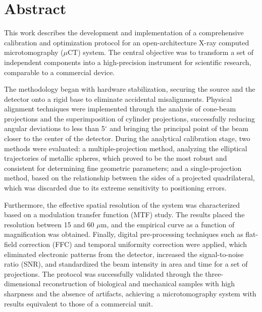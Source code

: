 \chapter*{Abstract}

This work describes the development and implementation of a comprehensive calibration
and optimization protocol for an open-architecture X-ray computed microtomography
($\mu$CT) system. The central objective was to transform a set of independent components
into a high-precision instrument for scientific research, comparable to a commercial
device.

The methodology began with hardware stabilization, securing the source and the detector
onto a rigid base to eliminate accidental misalignments. Physical alignment techniques
were implemented through the analysis of cone-beam projections and the superimposition
of cylinder projections, successfully reducing angular deviations to less than 5$^{\circ}$
and bringing the principal point of the beam closer to the center of the detector.
During the analytical calibration stage, two methods were evaluated: a multiple-projection
method, analyzing the elliptical trajectories of metallic spheres, which proved to
be the most robust and consistent for determining fine geometric parameters; and a
single-projection method, based on the relationship between the sides of a projected
quadrilateral, which was discarded due to its extreme sensitivity to positioning
errors.

Furthermore, the effective spatial resolution of the system was characterized based
on a modulation transfer function (MTF) study. The results placed the resolution
between 15 and 60 $\mu$m, and the empirical curve as a function of magnification
was obtained. Finally, digital pre-processing techniques such as flat-field correction
(FFC) and temporal uniformity correction were applied, which eliminated electronic
patterns from the detector, increased the signal-to-noise ratio (SNR), and standardized
the beam intensity in area and time for a set of projections. The protocol was
successfully validated through the three-dimensional reconstruction of biological
and mechanical samples with high sharpness and the absence of artifacts, achieving
a microtomography system with results equivalent to those of a commercial unit.